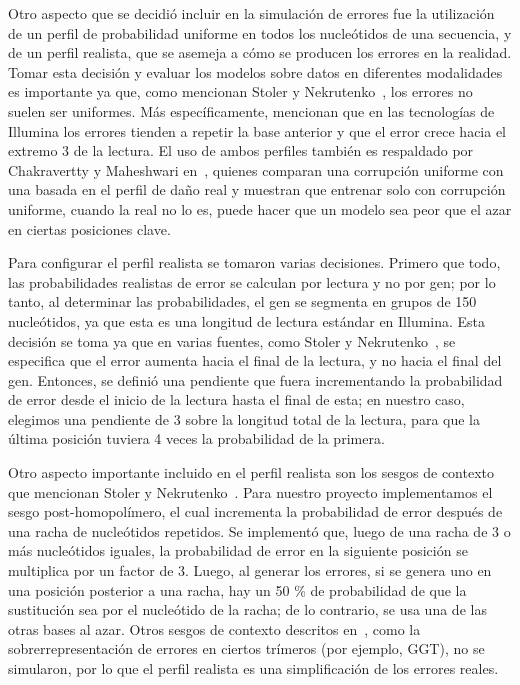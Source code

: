 \documentclass[sigconf,nonacm]{acmart}
\begin{document}
Otro aspecto que se decidió incluir en la simulación de errores fue la utilización de un perfil de probabilidad uniforme en todos los nucleótidos de una secuencia, y de un perfil realista, que se asemeja a cómo se producen los errores en la realidad. Tomar esta decisión y evaluar los modelos sobre datos en diferentes modalidades es importante ya que, como mencionan Stoler y Nekrutenko~\cite{stoler2021sequencing}, los errores no suelen ser uniformes. Más específicamente, mencionan que en las tecnologías de Illumina los errores tienden a repetir la base anterior y que el error crece hacia el extremo 3\textquotesingle{} de la lectura. El uso de ambos perfiles también es respaldado por Chakravertty y Maheshwari en~\cite{chakravertty2026vestige}, quienes comparan una corrupción uniforme con una basada en el perfil de daño real y muestran que entrenar solo con corrupción uniforme, cuando la real no lo es, puede hacer que un modelo sea peor que el azar en ciertas posiciones clave.

Para configurar el perfil realista se tomaron varias decisiones. Primero que todo, las probabilidades realistas de error se calculan por lectura y no por gen; por lo tanto, al determinar las probabilidades, el gen se segmenta en grupos de 150 nucleótidos, ya que esta es una longitud de lectura estándar en Illumina. Esta decisión se toma ya que en varias fuentes, como Stoler y Nekrutenko~\cite{stoler2021sequencing}, se especifica que el error aumenta hacia el final de la lectura, y no hacia el final del gen. Entonces, se definió una pendiente que fuera incrementando la probabilidad de error desde el inicio de la lectura hasta el final de esta; en nuestro caso, elegimos una pendiente de 3 sobre la longitud total de la lectura, para que la última posición tuviera 4 veces la probabilidad de la primera.

Otro aspecto importante incluido en el perfil realista son los sesgos de contexto que mencionan Stoler y Nekrutenko~\cite{stoler2021sequencing}. Para nuestro proyecto implementamos el sesgo post-homopolímero, el cual incrementa la probabilidad de error después de una racha de nucleótidos repetidos. Se implementó que, luego de una racha de 3 o más nucleótidos iguales, la probabilidad de error en la siguiente posición se multiplica por un factor de 3. Luego, al generar los errores, si se genera uno en una posición posterior a una racha, hay un 50 \% de probabilidad de que la sustitución sea por el nucleótido de la racha; de lo contrario, se usa una de las otras bases al azar. Otros sesgos de contexto descritos en~\cite{stoler2021sequencing}, como la sobrerrepresentación de errores en ciertos trímeros (por ejemplo, GGT), no se simularon, por lo que el perfil realista es una simplificación de los errores reales.
\end{document}
